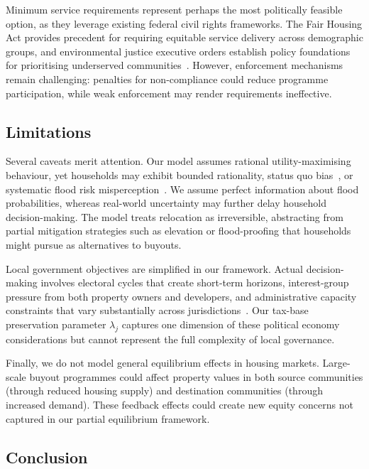 \documentclass[11pt,letterpaper]{article}
\theoremstyle{definition}
\begin{document}
Minimum service requirements represent perhaps the most politically feasible option, as they leverage existing federal civil rights frameworks. The Fair Housing Act provides precedent for requiring equitable service delivery across demographic groups, and environmental justice executive orders establish policy foundations for prioritising underserved communities~\cite{bullard2007toxic}. However, enforcement mechanisms remain challenging: penalties for non-compliance could reduce programme participation, while weak enforcement may render requirements ineffective.

\subsection*{Limitations}

Several caveats merit attention. Our model assumes rational utility-maximising behaviour, yet households may exhibit bounded rationality, status quo bias~\cite{samuelson1988status}, or systematic flood risk misperception~\cite{meyer2017ostrich}. We assume perfect information about flood probabilities, whereas real-world uncertainty may further delay household decision-making. The model treats relocation as irreversible, abstracting from partial mitigation strategies such as elevation or flood-proofing that households might pursue as alternatives to buyouts.

Local government objectives are simplified in our framework. Actual decision-making involves electoral cycles that create short-term horizons, interest-group pressure from both property owners and developers, and administrative capacity constraints that vary substantially across jurisdictions~\cite{greer2021political}. Our tax-base preservation parameter $\lambda_j$ captures one dimension of these political economy considerations but cannot represent the full complexity of local governance.

Finally, we do not model general equilibrium effects in housing markets. Large-scale buyout programmes could affect property values in both source communities (through reduced housing supply) and destination communities (through increased demand). These feedback effects could create new equity concerns not captured in our partial equilibrium framework.

\subsection*{Conclusion}
\end{document}
